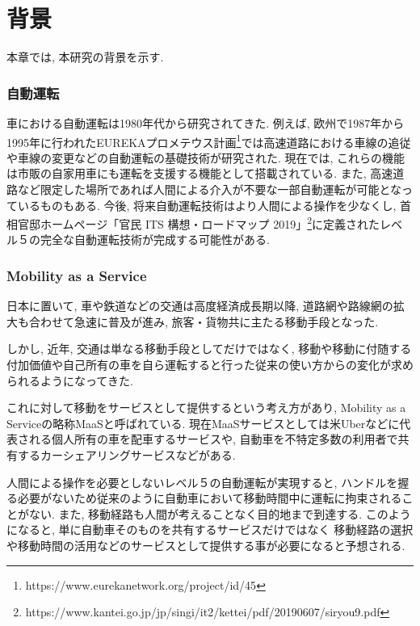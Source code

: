 \chapter{背景}
\label{background}



本章では, 本研究の背景を示す.

\subsection{自動運転}

車における自動運転は1980年代から研究されてきた.
例えば, 欧州で1987年から1995年に行われたEUREKAプロメテウス計画\footnote[1]{https://www.eurekanetwork.org/project/id/45}では高速道路における車線の追従や車線の変更などの自動運転の基礎技術が研究された.
現在では, これらの機能は市販の自家用車にも運転を支援する機能として搭載されている. また, 高速道路など限定した場所であれば人間による介入が不要な一部自動運転が可能となっているものもある.
今後, 将来自動運転技術はより人間による操作を少なくし, 首相官邸ホームページ「官民 ITS 構想・ロードマップ 2019」\footnote[2]{https://www.kantei.go.jp/jp/singi/it2/kettei/pdf/20190607/siryou9.pdf}に定義されたレベル５の完全な自動運転技術が完成する可能性がある.



\subsection{Mobility as a Service}

日本に置いて, 車や鉄道などの交通は高度経済成長期以降, 道路網や路線網の拡大も合わせて急速に普及が進み, 旅客・貨物共に主たる移動手段となった. 

しかし, 近年, 交通は単なる移動手段としてだけではなく, 移動や移動に付随する付加価値や自己所有の車を自ら運転すると行った従来の使い方からの変化が求められるようになってきた.

これに対して移動をサービスとして提供するという考え方があり, Mobility as a Serviceの略称MaaSと呼ばれている. 現在MaaSサービスとしては米Uberなどに代表される個人所有の車を配車するサービスや, 自動車を不特定多数の利用者で共有するカーシェアリングサービスなどがある.

人間による操作を必要としないレベル５の自動運転が実現すると, ハンドルを握る必要がないため従来のように自動車において移動時間中に運転に拘束されることがない.
また, 移動経路も人間が考えることなく目的地まで到達する. このようになると, 単に自動車そのものを共有するサービスだけではなく
移動経路の選択や移動時間の活用などのサービスとして提供する事が必要になると予想される.

